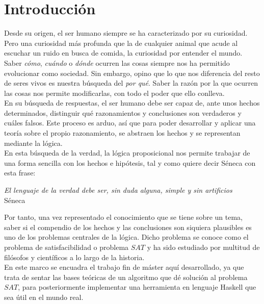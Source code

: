 \chapter*{Introducción}

Desde su origen, el ser humano siempre se ha caracterizado por su curiosidad. Pero una curiosidad más profunda que la de cualquier animal que acude al escuchar un ruido en busca de comida, la curiosidad por entender el mundo.\\

Saber \textit{cómo}, \textit{cuándo} o \textit{dónde} ocurren las cosas siempre nos ha permitido evolucionar como sociedad. Sin embargo, opino que lo que nos diferencia del resto de seres vivos es nuestra búsqueda del \textit{por qué}. Saber la razón por la que ocurren las cosas nos permite modificarlas, con todo el poder que ello conlleva.\\

En su búsqueda de respuestas, el ser humano debe ser capaz de, ante unos hechos determinados, distinguir qué razonamientos y conclusiones son verdaderos y cuáles falsos. Este proceso es arduo, así que para poder desarrollar y aplicar una teoría sobre el propio razonamiento, se abstraen los hechos y se representan mediante la lógica. \\

En esta búsqueda de la verdad, la lógica proposicional nos permite trabajar de una forma sencilla con los hechos e hipótesis, tal y como quiere decir Séneca con esta frase:

\begin{center}
\textit{El lenguaje de la verdad debe ser, sin duda alguna, simple y sin artificios}\\
\hspace{10.7cm} Séneca
\end{center}

Por tanto, una vez representado el conocimiento que se tiene sobre un tema, saber si el compendio de los hechos y las conclusiones son siquiera plausibles es uno de los problemas centrales de la lógica. Dicho problema se conoce como el problema de satisfacibilidad o problema $SAT$ y ha sido estudiado por multitud de filósofos y científicos a lo largo de la historia.\\

En este marco se encuadra el trabajo fin de máster aquí desarrollado, ya que trata de sentar las bases teóricas de un algoritmo que dé solución al problema $SAT$, para posteriormente implementar una herramienta en lenguaje Haskell que sea útil en el mundo real.\\

